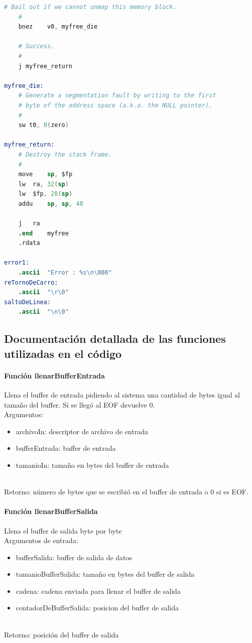 \documentclass[a4paper]{article}
\begin{document}
\begin{lstlisting}[language=Assembler]
	# Bail out if we cannot unmap this memory block.
	#
	bnez	v0, myfree_die

	# Success.
	#
	j myfree_return

myfree_die:
	# Generate a segmentation fault by writing to the first
	# byte of the address space (a.k.a. the NULL pointer).
	#
	sw t0, 0(zero)

myfree_return:
	# Destroy the stack frame.
	#
	move	sp, $fp
	lw	ra, 32(sp)
	lw	$fp, 28(sp)
	addu	sp, sp, 40

	j	ra
	.end	myfree
	.rdata

error1:
	.ascii	"Error : %s\n\000"
reTornoDeCarro:
	.ascii	"\r\0"
saltoDeLinea:
	.ascii	"\n\0"

\end{lstlisting}



\subsection{Documentación detallada de las funciones utilizadas en el código}
\paragraph{Función llenarBufferEntrada}
Llena el buffer de entrada pidiendo al sistema una cantidad de bytes igual al tamaño del buffer. Si se llegó al EOF devuelve 0. \\
Argumentos:
	\begin{itemize}
	\item archivoIn:	descriptor de archivo de entrada
	\item bufferEntrada:	buffer de entrada
	\item tamanioIn:	tamaño en bytes del buffer de entrada
\end{itemize} \\
Retorno: número de bytes que se escribió en el buffer de entrada o 0 si es EOF. 


\paragraph{Función llenarBufferSalida}
Llena el buffer de salida byte por byte \\
Argumentos de entrada:
\begin{itemize}
	\item bufferSalida:	buffer de salida de datos
	\item tamanioBufferSalida: tamaño en bytes del buffer de salida
	\item cadena: cadena enviada para llenar el buffer de salida
	\item contadorDeBufferSalida: posicion del buffer de salida
\end{itemize} \\
Retorno:  posición del buffer de salida
\end{document}
